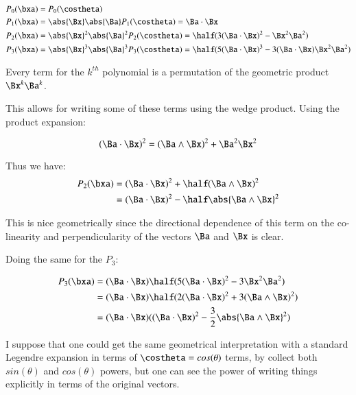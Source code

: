 \begin{align*}
P_0(\bxa) &= P_0(\costheta) \\
P_1(\bxa) &= \abs{\Bx}\abs{\Ba} P_1(\costheta) = \Ba \cdot \Bx \\
P_2(\bxa) &= \abs{\Bx}^2\abs{\Ba}^2 P_2(\costheta) = \half(3(\Ba \cdot \Bx)^2 - \Bx^2\Ba^2) \\
P_3(\bxa) &= \abs{\Bx}^3\abs{\Ba}^3 P_3(\costheta) = \half(5(\Ba \cdot \Bx)^3 - 3(\Ba \cdot \Bx) \Bx^2\Ba^2) \\
\end{align*}

Every term for the $k^{th}$ polynomial is a permutation of the geometric product $\Bx^k\Ba^k$.

This allows for writing some of these terms using the wedge product.  Using the product expansion:

\[
(\Ba \cdot \Bx)^2 = ( \Ba \wedge \Bx )^2 + \Ba^2 \Bx^2
\]

Thus we have:
\begin{align*}
P_2(\bxa)
&= (\Ba \cdot \Bx)^2 + \half(\Ba \wedge \Bx)^2 \\
&= (\Ba \cdot \Bx)^2 - \half\abs{\Ba \wedge \Bx}^2 \\
\end{align*}

This is nice geometrically since the directional dependence of this term on the co-linearity and 
perpendicularity of the vectors $\Ba$ and $\Bx$ is clear.

Doing the same for the $P_3$:

\begin{align*}
P_3(\bxa) &= (\Ba \cdot \Bx)\half(5(\Ba \cdot \Bx)^2 - 3\Bx^2\Ba^2) \\
          &= (\Ba \cdot \Bx)\half(2(\Ba \cdot \Bx)^2 + 3(\Ba \wedge \Bx)^2) \\
          &= (\Ba \cdot \Bx)((\Ba \cdot \Bx)^2 - \frac{3}{2}\abs{\Ba \wedge \Bx}^2) \\
\end{align*}

I suppose that one could get the same geometrical interpretation with a standard Legendre expansion in terms of $\costheta = cos(\theta)$ terms, by collect both $sin(\theta)$ and $cos(\theta)$ powers, but one
can see the power of writing things explicitly in terms of the original vectors.


